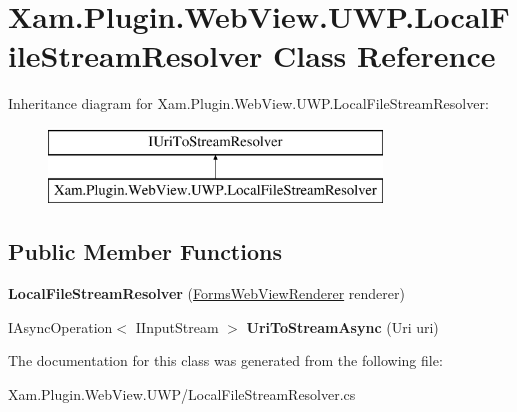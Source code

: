 \hypertarget{class_xam_1_1_plugin_1_1_web_view_1_1_u_w_p_1_1_local_file_stream_resolver}{}\section{Xam.\+Plugin.\+Web\+View.\+U\+W\+P.\+Local\+File\+Stream\+Resolver Class Reference}
\label{class_xam_1_1_plugin_1_1_web_view_1_1_u_w_p_1_1_local_file_stream_resolver}
Inheritance diagram for Xam.\+Plugin.\+Web\+View.\+U\+W\+P.\+Local\+File\+Stream\+Resolver\+:\begin{figure}[H]
\begin{center}
\leavevmode
\includegraphics[height=2.000000cm]{class_xam_1_1_plugin_1_1_web_view_1_1_u_w_p_1_1_local_file_stream_resolver}
\end{center}
\end{figure}
\subsection*{Public Member Functions}
\begin{DoxyCompactItemize}
\item 
\mbox{\label{class_xam_1_1_plugin_1_1_web_view_1_1_u_w_p_1_1_local_file_stream_resolver_a76064a26bf9006c8a0ec37dd1561562e}} 
{\bfseries Local\+File\+Stream\+Resolver} (\hyperlink{class_xam_1_1_plugin_1_1_web_view_1_1_u_w_p_1_1_forms_web_view_renderer}{Forms\+Web\+View\+Renderer} renderer)
\item 
\mbox{\label{class_xam_1_1_plugin_1_1_web_view_1_1_u_w_p_1_1_local_file_stream_resolver_aa96c6cd0947a03550fa2c45d717e794a}} 
I\+Async\+Operation$<$ I\+Input\+Stream $>$ {\bfseries Uri\+To\+Stream\+Async} (Uri uri)
\end{DoxyCompactItemize}


The documentation for this class was generated from the following file\+:\begin{DoxyCompactItemize}
\item 
Xam.\+Plugin.\+Web\+View.\+U\+W\+P/Local\+File\+Stream\+Resolver.\+cs\end{DoxyCompactItemize}
